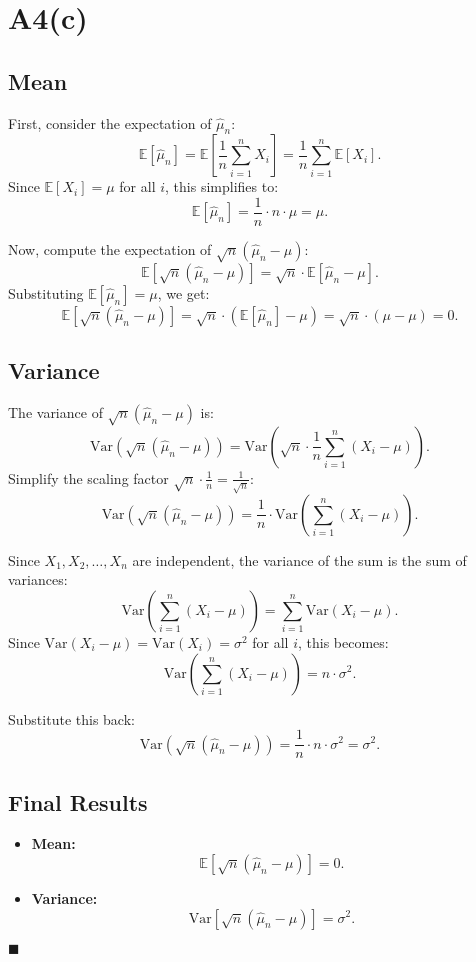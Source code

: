 \documentclass{article}
\begin{document}
\section*{A4(c)}

\subsection*{Mean}
First, consider the expectation of \( \hat{\mu}_n \):
\[
\mathbb{E}[\hat{\mu}_n] = \mathbb{E} \left[ \frac{1}{n} \sum_{i=1}^n X_i \right] = \frac{1}{n} \sum_{i=1}^n \mathbb{E}[X_i].
\]
Since \( \mathbb{E}[X_i] = \mu \) for all \( i \), this simplifies to:
\[
\mathbb{E}[\hat{\mu}_n] = \frac{1}{n} \cdot n \cdot \mu = \mu.
\]

Now, compute the expectation of \( \sqrt{n} (\hat{\mu}_n - \mu) \):
\[
\mathbb{E}[\sqrt{n} (\hat{\mu}_n - \mu)] = \sqrt{n} \cdot \mathbb{E}[\hat{\mu}_n - \mu].
\]
Substituting \( \mathbb{E}[\hat{\mu}_n] = \mu \), we get:
\[
\mathbb{E}[\sqrt{n} (\hat{\mu}_n - \mu)] = \sqrt{n} \cdot (\mathbb{E}[\hat{\mu}_n] - \mu) = \sqrt{n} \cdot (\mu - \mu) = 0.
\]

\subsection*{Variance}
The variance of \( \sqrt{n} (\hat{\mu}_n - \mu) \) is:
\[
\text{Var}\left(\sqrt{n} (\hat{\mu}_n - \mu)\right) = \text{Var}\left(\sqrt{n} \cdot \frac{1}{n} \sum_{i=1}^n (X_i - \mu)\right).
\]
Simplify the scaling factor \( \sqrt{n} \cdot \frac{1}{n} = \frac{1}{\sqrt{n}} \):
\[
\text{Var}\left(\sqrt{n} (\hat{\mu}_n - \mu)\right) = \frac{1}{n} \cdot \text{Var}\left(\sum_{i=1}^n (X_i - \mu)\right).
\]

Since \( X_1, X_2, \ldots, X_n \) are independent, the variance of the sum is the sum of variances:
\[
\text{Var}\left(\sum_{i=1}^n (X_i - \mu)\right) = \sum_{i=1}^n \text{Var}(X_i - \mu).
\]
Since \( \text{Var}(X_i - \mu) = \text{Var}(X_i) = \sigma^2 \) for all \( i \), this becomes:
\[
\text{Var}\left(\sum_{i=1}^n (X_i - \mu)\right) = n \cdot \sigma^2.
\]

Substitute this back:
\[
\text{Var}\left(\sqrt{n} (\hat{\mu}_n - \mu)\right) = \frac{1}{n} \cdot n \cdot \sigma^2 = \sigma^2.
\]

\subsection*{Final Results}
\begin{itemize}
    \item \textbf{Mean:}
    \[
    \mathbb{E}[\sqrt{n} (\hat{\mu}_n - \mu)] = 0.
    \]
    \item \textbf{Variance:}
    \[
    \text{Var}[\sqrt{n} (\hat{\mu}_n - \mu)] = \sigma^2.
    \]
\end{itemize}

\hfill\(\blacksquare\)
\end{document}
